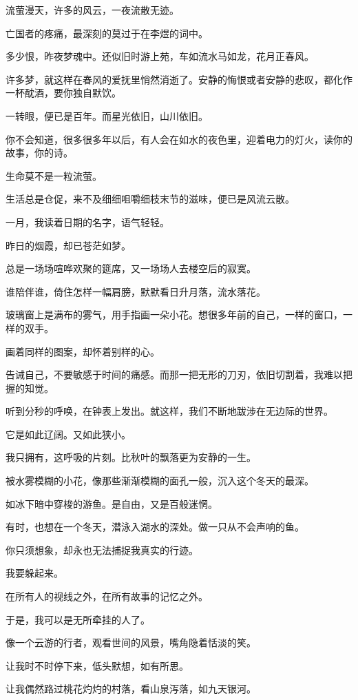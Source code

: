 		流萤漫天，许多的风云，一夜流散无迹。\par
		亡国者的疼痛，最深刻的莫过于在李煜的词中。\par
		多少恨，昨夜梦魂中。还似旧时游上苑，车如流水马如龙，花月正春风。\par
		许多梦，就这样在春风的爱抚里悄然消逝了。安静的悔恨或者安静的悲叹，都化作一杯酖酒，要你独自默饮。\par
		一转眼，便已是百年。而星光依旧，山川依旧。\par
		你不会知道，很多很多年以后，有人会在如水的夜色里，迎着电力的灯火，读你的故事，你的诗。\par
		生命莫不是一粒流萤。

	\endwriting



		生活总是仓促，来不及细细咀嚼细枝末节的滋味，便已是风流云散。\par
		一月，我读着日期的名字，语气轻轻。

		昨日的烟霞，却已苍茫如梦。

		总是一场场喧哗欢聚的筵席，又一场场人去楼空后的寂寞。\par
		谁陪伴谁，倚住怎样一幅肩膀，默默看日升月落，流水落花。

		玻璃窗上是满布的雾气，用手指画一朵小花。想很多年前的自己，一样的窗口，一样的双手。\par
		画着同样的图案，却怀着别样的心。\par
		告诫自己，不要敏感于时间的痛感。而那一把无形的刀刃，依旧切割着，我难以把握的知觉。\par
		听到分秒的呼唤，在钟表上发出。就这样，我们不断地跋涉在无边际的世界。\par
		它是如此辽阔。又如此狭小。\par
		我只拥有，这呼吸的片刻。比秋叶的飘落更为安静的一生。

		被水雾模糊的小花，像那些渐渐模糊的面孔一般，沉入这个冬天的最深。\par
		如冰下暗中穿梭的游鱼。是自由，又是百般迷惘。\par
		有时，也想在一个冬天，潜泳入湖水的深处。做一只从不会声响的鱼。\par
		你只须想象，却永也无法捕捉我真实的行迹。\par
		我要躲起来。\par
		在所有人的视线之外，在所有故事的记忆之外。

		于是，我可以是无所牵挂的人了。

		像一个云游的行者，观看世间的风景，嘴角隐着恬淡的笑。\par
		让我时不时停下来，低头默想，如有所思。\par
		让我偶然路过桃花灼灼的村落，看山泉泻落，如九天银河。

